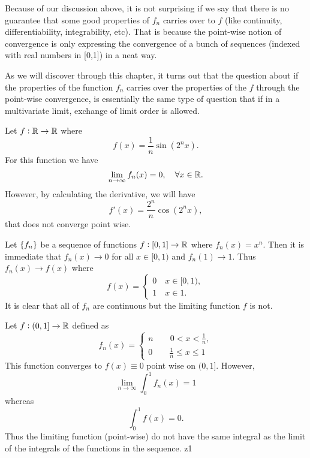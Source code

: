 Because of our discussion above, it is not surprising if we say that there is no guarantee that some good properties of $f_n$ carries over to $f$ (like continuity, differentiability, integrability, etc). That is because the point-wise notion of convergence is only expressing the convergence of a bunch of sequences (indexed with real numbers in [0,1]) in a neat way.

As we will discover through this chapter, it turns out that the question about if the properties of the function $f_n$ carries over the properties of the $f$ through the point-wise convergence, is essentially the same type of question that if in a multivariate limit, exchange of limit order is allowed. 


\begin{example}
	Let $ f:\mathbb{R} \to \mathbb{R} $ where
	\[ f(x) = \frac1n \sin(2^n x). \]
	For this function we have
	\[ \lim_{n\to\infty} f_n(x) = 0, \quad \forall x \in \mathbb{R}. \]
	However, by calculating the derivative, we will have
	\[ f'(x) = \frac{2^n}{n}\cos(2^nx),  \]
	that does not converge point wise.
\end{example}

\begin{example}
	\label{exmp:PointwiseLimCont}
	Let $\{f_n\}$ be a sequence of functions $f:[0,1]\to \mathbb{R}$ where $f_n(x) = x^n$. Then it is immediate that $f_n(x) \to 0$ for all $x \in [0,1)$ and $f_n(1) \to 1$. Thus $f_n(x) \to f(x)$ where
	\[ f(x) = \begin{cases}
		0 \quad x \in [0,1), \\
		1 \quad x \in 1.
	\end{cases} \]
	It is clear that all of $f_n$ are continuous but the limiting function $f$ is not. 
\end{example}

\begin{example}
	\label{exmp:PointWiseContNotPreserveInt}
	Let $ f:(0,1] \to \mathbb{R} $ defined as 
	\[ f_n(x) = \begin{cases}
		n \qquad 0<x<\frac1n,\\
		0 \qquad \frac1n \leq x \leq 1
	\end{cases} \]
	This function converges to $ f(x) \equiv 0 $ point wise on $ (0,1] $. However, 
	\[ \lim_{n\to\infty}\int_{0}^{1}f_n(x) = 1 \]
	whereas
	\[ \int_{0}^{1}f(x) = 0. \]
	Thus the limiting function (point-wise) do not have the same integral as the limit of the integrals of the functions in the sequence. z1
\end{example}





